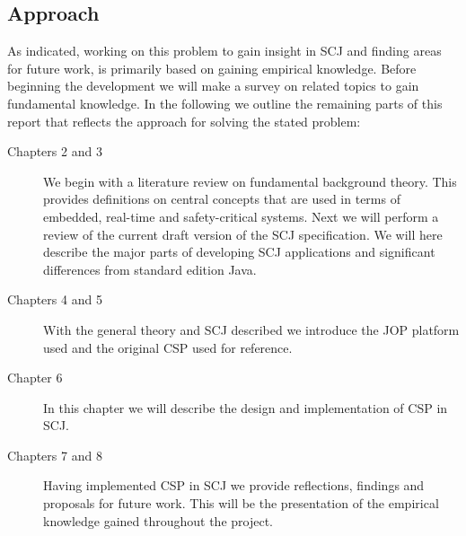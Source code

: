 \subsection{Approach} %
\label{sub:method}
As indicated, working on this problem to gain insight in SCJ and finding areas for future work, is primarily based on gaining empirical knowledge. Before beginning the development we will make a survey on related topics to gain fundamental knowledge. In the following we outline the remaining parts of this report that reflects the approach for solving the stated problem:
\begin{description}
	\item[Chapters 2 and 3] We begin with a literature review on fundamental background theory. This provides definitions on central concepts that are used in terms of embedded, real-time and safety-critical systems. Next we will perform a review of the current draft version of the SCJ specification. We will here describe the major parts of developing SCJ applications and significant differences from standard edition Java.
	\item[Chapters 4 and 5] With the general theory and SCJ described we introduce the JOP platform used and the original CSP used for reference.
	\item[Chapter 6]  In this chapter we will describe the design and implementation of CSP in SCJ.
	\item[Chapters 7 and 8] Having implemented CSP in SCJ we provide reflections, findings and proposals for future work. This will be the presentation of the empirical knowledge gained throughout the project.
\end{description}



